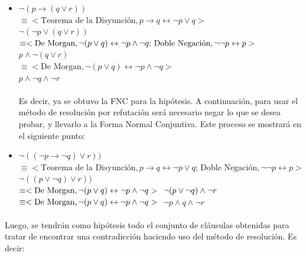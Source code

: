 \documentclass{article}
\begin{document}
\begin{itemize}
\begin{itemize}
\begin{itemize}
		\item $\neg(p \rightarrow (q \lor r))$ \\
				$\equiv < \text{Teorema de la Disyunci\'on},  
					p \rightarrow q \leftrightarrow \neg p \lor q >$ \\
				$ \neg( \neg p \lor (q \lor r))$ \\
				$ \equiv <\text{De Morgan}, 
					\neg(p \lor q) \leftrightarrow \neg p \land \neg q \text {; Doble Negaci\'on}, \neg \neg p \leftrightarrow p> \\ $
				$ p \land \neg ( q \lor r)$ \\
				$ \equiv <\text{De Morgan}, 
					\neg(p \lor q) \leftrightarrow \neg p \land \neg q>  $ \\
				$ p \land \neg q \land \neg r$
		
		\paragraph{}		
		Es decir, ya se obtuvo la FNC para la hip\'otesis. A continuaci\'on, para usar el m\'etodo de resoluci\'on por refutaci\'on ser\'a necesario negar lo que se desea probar, y llevarlo a la Forma Normal Conjuntiva. Este proceso se mostrar\'a en el siguiente punto: \\
		
		\item $\neg((\neg p \rightarrow \neg q) \lor r))$ \\
				$\equiv < \text{Teorema de la Disyunci\'on},  
					p \rightarrow q \leftrightarrow \neg p \lor q \text {; Doble Negaci\'on}, \neg \neg p \leftrightarrow p >$ \\
				$\neg((p \lor \neg q) \lor r))$ \\
				$\equiv <\text{De Morgan}, 
					\neg(p \lor q) \leftrightarrow \neg p \land \neg q> \\$
				$ \neg(p \lor \neg q) \land \neg r \\$				
				$\equiv <\text{De Morgan}, 
					\neg(p \lor q) \leftrightarrow \neg p \land \neg q> \\$
				$\neg p \land q \land \neg r$

		\end{itemize}				 
		
		\paragraph{}
		Luego, se tendr\'an como hip\'otesis todo el conjunto de cl\'ausulas obtenidas para tratar de encontrar una contradicci\'on haciendo uso del m\'etodo de resoluci\'on. Es decir:
		

\end{itemize}
\end{itemize}
\end{document}
